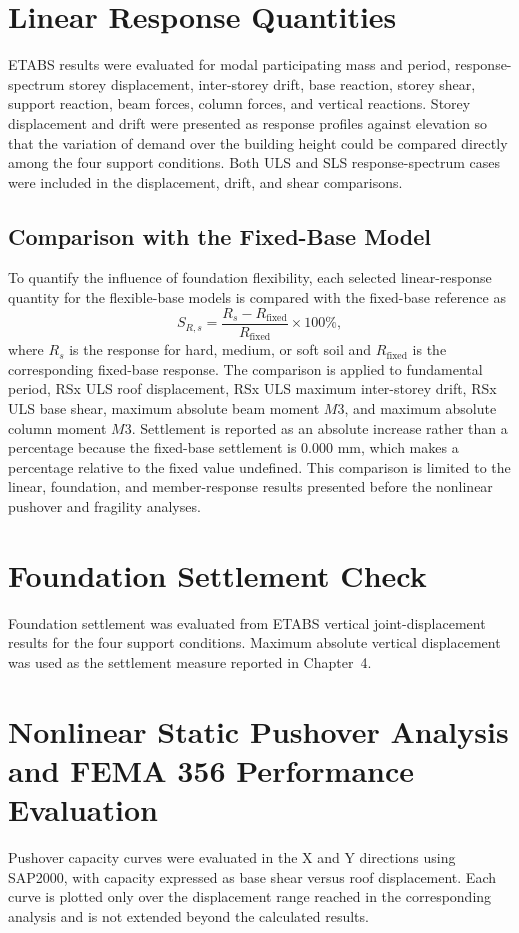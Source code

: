 \section{Linear Response Quantities}
ETABS results were evaluated for modal participating mass and period, response-spectrum storey displacement, inter-storey drift, base reaction, storey shear, support reaction, beam forces, column forces, and vertical reactions. Storey displacement and drift were presented as response profiles against elevation so that the variation of demand over the building height could be compared directly among the four support conditions. Both ULS and SLS response-spectrum cases were included in the displacement, drift, and shear comparisons.

\subsection{Comparison with the Fixed-Base Model}
To quantify the influence of foundation flexibility, each selected linear-response quantity for the flexible-base models is compared with the fixed-base reference as
\begin{equation}
S_{R,s}=\frac{R_s-R_{\mathrm{fixed}}}{R_{\mathrm{fixed}}}\times100\%,
\label{eq:ssi_sensitivity}
\end{equation}
where $R_s$ is the response for hard, medium, or soft soil and $R_{\mathrm{fixed}}$ is the corresponding fixed-base response. The comparison is applied to fundamental period, RSx ULS roof displacement, RSx ULS maximum inter-storey drift, RSx ULS base shear, maximum absolute beam moment $M3$, and maximum absolute column moment $M3$. Settlement is reported as an absolute increase rather than a percentage because the fixed-base settlement is 0.000 mm, which makes a percentage relative to the fixed value undefined. This comparison is limited to the linear, foundation, and member-response results presented before the nonlinear pushover and fragility analyses.

\section{Foundation Settlement Check}
Foundation settlement was evaluated from ETABS vertical joint-displacement results for the four support conditions. Maximum absolute vertical displacement was used as the settlement measure reported in Chapter~4.

\section{Nonlinear Static Pushover Analysis and FEMA 356 Performance Evaluation}
Pushover capacity curves were evaluated in the X and Y directions using SAP2000, with capacity expressed as base shear versus roof displacement. Each curve is plotted only over the displacement range reached in the corresponding analysis and is not extended beyond the calculated results.

